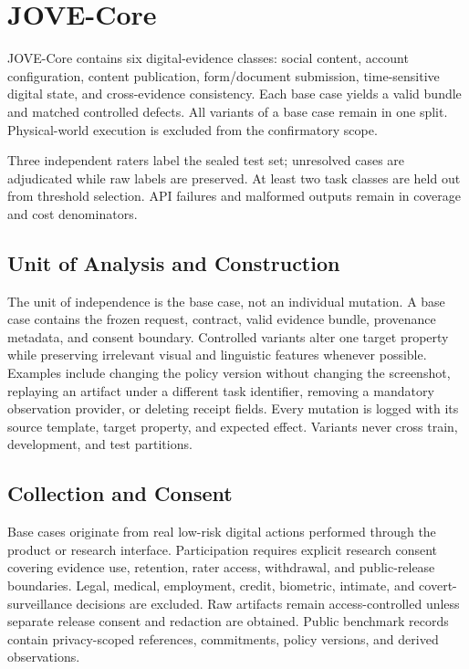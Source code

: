 \documentclass[sigconf,anonymous,review]{acmart}
\begin{document}
\section{JOVE-Core}
JOVE-Core contains six digital-evidence classes: social content, account configuration, content publication, form/document submission, time-sensitive digital state, and cross-evidence consistency. Each base case yields a valid bundle and matched controlled defects. All variants of a base case remain in one split. Physical-world execution is excluded from the confirmatory scope.

\begin{table}[t]
\centering
\caption{Contract properties are tested by matched defects and property-aligned ablations.}

\label{tab:failuremap}
\end{table}

Three independent raters label the sealed test set; unresolved cases are adjudicated while raw labels are preserved. At least two task classes are held out from threshold selection. API failures and malformed outputs remain in coverage and cost denominators.

\subsection{Unit of Analysis and Construction}
The unit of independence is the base case, not an individual mutation. A base case contains the frozen request, contract, valid evidence bundle, provenance metadata, and consent boundary. Controlled variants alter one target property while preserving irrelevant visual and linguistic features whenever possible. Examples include changing the policy version without changing the screenshot, replaying an artifact under a different task identifier, removing a mandatory observation provider, or deleting receipt fields. Every mutation is logged with its source template, target property, and expected effect. Variants never cross train, development, and test partitions.

\subsection{Collection and Consent}
Base cases originate from real low-risk digital actions performed through the product or research interface. Participation requires explicit research consent covering evidence use, retention, rater access, withdrawal, and public-release boundaries. Legal, medical, employment, credit, biometric, intimate, and covert-surveillance decisions are excluded. Raw artifacts remain access-controlled unless separate release consent and redaction are obtained. Public benchmark records contain privacy-scoped references, commitments, policy versions, and derived observations.
\end{document}
